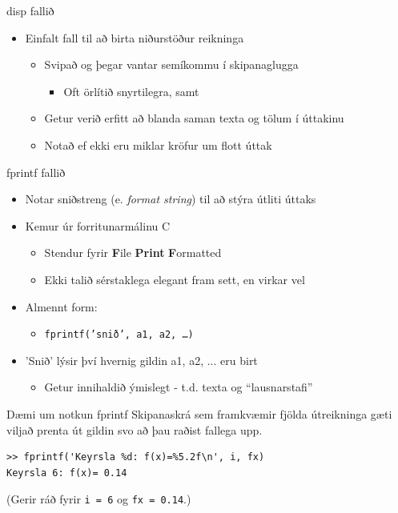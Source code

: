 \documentclass[handout]{beamer}
\begin{document}
\begin{frame}{disp fallið}
\begin{itemize}
 \item Einfalt fall til að birta niðurstöður reikninga
 \begin{itemize}
  \item Svipað og þegar vantar semíkommu í skipanaglugga
  \begin{itemize}
   \item Oft örlítið snyrtilegra, samt
  \end{itemize}
  \item Getur verið erfitt að blanda saman texta og tölum í úttakinu
  \item Notað ef ekki eru miklar kröfur um flott úttak
 \end{itemize}
\end{itemize}
\end{frame}

\begin{frame}{fprintf fallið}
\begin{itemize}
 \item Notar sniðstreng (e. \emph{format string}) til að stýra útliti úttaks
 \item Kemur úr forritunarmálinu C
 \begin{itemize}
  \item Stendur fyrir \textbf{F}ile \textbf{Print} \textbf{F}ormatted
  \item Ekki talið sérstaklega elegant fram sett, en virkar vel
 \end{itemize}
 \item Almennt form:
 \begin{itemize}
  \item \texttt{fprintf('snið', a1, a2, \ldots )}
 \end{itemize}
 \item 'Snið' lýsir því hvernig gildin a1, a2, ... eru birt
 \begin{itemize}
  \item Getur innihaldið ýmislegt - t.d. texta og ``lausnarstafi''
 \end{itemize}

\end{itemize}
\end{frame}

\begin{frame}[fragile]{Dæmi um notkun fprintf}
Skipanaskrá sem framkvæmir fjölda útreikninga gæti viljað prenta út gildin svo að þau raðist fallega upp.

\begin{verbatim}
>> fprintf('Keyrsla %d: f(x)=%5.2f\n', i, fx)
Keyrsla 6: f(x)= 0.14
\end{verbatim}

(Gerir ráð fyrir \texttt{i = 6} og \texttt{fx = 0.14}.)

\end{frame}
\end{document}
